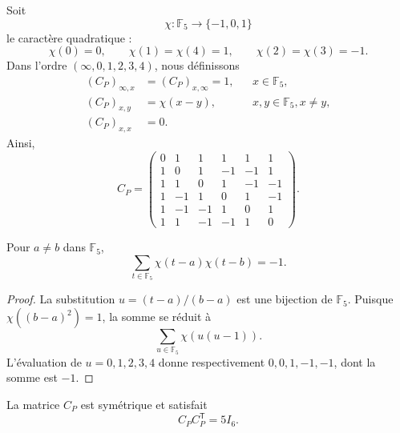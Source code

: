 Soit
\[
 \chi:\mathbb F_5\longrightarrow\{-1,0,1\}
\]
le caractère quadratique :
\[
 \chi(0)=0,
 \qquad
 \chi(1)=\chi(4)=1,
 \qquad
 \chi(2)=\chi(3)=-1.
\]
Dans l'ordre \((\infty,0,1,2,3,4)\), nous définissons
\begin{align}
 (C_P)_{\infty,x}&=(C_P)_{x,\infty}=1,
 &&x\in\mathbb F_5,\label{p12-83-c20-s1:eq:paley-fila-infinito}\\
 (C_P)_{x,y}&=\chi(x-y),
 &&x,y\in\mathbb F_5, x\neq y,\label{p12-83-c20-s1:eq:paley-entradas-finitas}\\
 (C_P)_{x,x}&=0.
 \label{p12-83-c20-s1:eq:paley-diagonal}
\end{align}
Ainsi,
\begin{equation}
 C_P=
 \begin{pmatrix}
 0& 1& 1& 1& 1& 1\\
 1& 0& 1&-1&-1& 1\\
 1& 1& 0& 1&-1&-1\\
 1&-1& 1& 0& 1&-1\\
 1&-1&-1& 1& 0& 1\\
 1& 1&-1&-1& 1& 0
 \end{pmatrix}.
 \label{p12-83-c20-s1:eq:matriz-conferencia-paley-autonoma}
\end{equation}

\begin{lemma}
\label{p12-83-c20-s1:lem:correlacion-cuadratica-f5}
Pour \(a\neq b\) dans \(\mathbb F_5\),
\begin{equation}
 \sum_{t\in\mathbb F_5}
 \chi(t-a)\chi(t-b)=-1.
 \label{p12-83-c20-s1:eq:correlacion-cuadratica-f5}
\end{equation}
\end{lemma}

\begin{proof}
La substitution \(u=(t-a)/(b-a)\) est une bijection de \(\mathbb F_5\).
Puisque \(\chi((b-a)^2)=1\), la somme se réduit à
\[
 \sum_{u\in\mathbb F_5}\chi(u(u-1)).
\]
L'évaluation de \(u=0,1,2,3,4\) donne respectivement
\(0,0,1,-1,-1\), dont la somme est \(-1\).
\end{proof}

\begin{proposition}
\label{p12-83-c20-s1:prop:paley-identidad-conferencia-autonoma}
La matrice \(C_P\) est symétrique et satisfait
\begin{equation}
 \boxed{C_PC_P^{\mathsf T}=5I_6.}
 \label{p12-83-c20-s1:eq:paley-identidad-conferencia-autonoma}
\end{equation}
\end{proposition}

